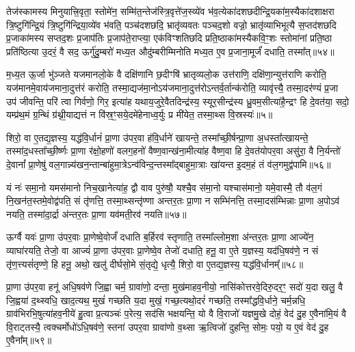 तेज॑स्कामस्य मिनुयात्त्रि॒वृता॒ स्तोमे॑न॒ सम्मि॑त॒न्तेज॑स्त्रि॒वृत्ते॑ज॒स्व्ये॑व भ॑व॒त्येका॑दशछदीन्द्रि॒यका॑म॒स्यैका॑दशाक्षरा त्रि॒ष्टुगि॑न्द्रि॒यं त्रि॒ष्टुगि॑न्द्रिया॒व्ये॑व भ॑वति॒ पञ्च॑दशछदि॒ भ्रातृ॑व्यवतः पञ्चद॒शो वज्रो॒ भ्रातृ॑व्याभिभूत्यै स॒प्तद॑शछदि प्र॒जाका॑मस्य सप्तद॒शः प्र॒जाप॑तिः प्र॒जाप॑ते॒राप्त्या॒ एक॑विꣳशतिछदि प्रति॒ष्ठाका॑मस्यैकवि॒ꣳ॒शः स्तोमा॑नां प्रति॒ष्ठा प्रति॑ष्ठित्या उ॒दरं॒ वै सद॒ ऊर्गु॑दु॒म्बरो॑ मध्य॒त औदु॑म्बरीम्मिनोति मध्य॒त ए॒व प्र॒जाना॒मूर्जं॑ दधाति॒ तस्मा᳚त्॥५४॥

म॒ध्य॒त ऊ॒र्जा भु॑ञ्जते यजमानलो॒के वै दक्षि॑णानि छ॒दीꣳषि॑ भ्रातृव्यलो॒क उत्त॑राणि॒ दक्षि॑णा॒न्युत्त॑राणि करोति॒ यज॑मानमे॒वाय॑जमाना॒दुत्त॑रं करोति॒ तस्मा॒द्यज॑मा॒नो\-ऽय॑जमाना॒दुत्त॑रो\-ऽन्तर्व॒र्तान्क॑रोति॒ व्यावृ॑त्त्यै॒ तस्मा॒दर॑ण्यं प्र॒जा उप॑ जीवन्ति॒ परि॑ त्वा गिर्वणो॒ गिर॒ इत्या॑ह यथाय॒जुरे॒वैतदिन्द्र॑स्य॒ स्यूर॒सीन्द्र॑स्य ध्रु॒वम॒सीत्या॑है॒न्द्रꣳ हि दे॒वत॑या॒ सदो॒ यम्प्र॑थ॒मं ग्र॒न्थिं ग्र॑थ्नी॒याद्यत्तं न वि॑स्र॒ꣳ॒सये॒दमे॑हेनाध्व॒र्युः प्र मी॑येत॒ तस्मा॒थ्स वि॒स्रस्यः॑॥५॥

{\anuvakamend[{अप॑हत्यै॒ तस्मा᳚त्पितृदेव॒त्य॑न्तेनै॒व नव॑छदि॒ तस्मा॒थ्सदः॒ पञ्च॑दश च॥10॥}]}

शिरो॒ वा ए॒तद्य॒ज्ञस्य॒ यद्ध॑वि॒र्धानं॑ प्रा॒णा उ॑पर॒वा ह॑वि॒र्धाने॑ खायन्ते॒ तस्मा᳚च्छी॒र्\mbox{}षन्प्रा॒णा अ॒धस्ता᳚त्खायन्ते॒ तस्मा॑द॒धस्ता᳚च्छी॒र्ष्णः प्रा॒णा र॑क्षो॒हणो॑ वलग॒हनो॑ वैष्ण॒वान्ख॑ना॒मीत्या॑ह वैष्ण॒वा हि दे॒वत॑योपर॒वा असु॑रा॒ वै नि॒र्यन्तो॑ दे॒वानां᳚ प्रा॒णेषु॑ वल॒गान्न्य॑खन॒न्तान्बा॑हुमा॒त्रे\-ऽन्व॑विन्द॒न्तस्मा᳚द्बाहुमा॒त्राः खा॑यन्त इ॒दम॒हं तं व॑ल॒गमुद्व॑पामि॥५६॥

यं नः॑ समा॒नो यमस॑मानो निच॒खानेत्या॑ह॒ द्वौ वाव पुरु॑षौ॒ यश्चै॒व स॑मा॒नो यश्चास॑मानो॒ यमे॒वास्मै॒ तौ व॑ल॒गं नि॒खन॑त॒स्तमे॒वोद्व॑पति॒ सं तृ॑णत्ति॒ तस्मा॒थ्सन्तृ॑ण्णा अन्तर॒तः प्रा॒णा न सम्भि॑नत्ति॒ तस्मा॒दस॑म्भिन्नाः प्रा॒णा अ॒पो\-ऽव॑ नयति॒ तस्मा॑दा॒र्द्रा अ॑न्तर॒तः प्रा॒णा यव॑मती॒रव॑ नयति॥५७॥

ऊर्ग्वै यवः॑ प्रा॒णा उ॑पर॒वाः प्रा॒णेष्वे॒वोर्जं॑ दधाति ब॒र्\mbox{}हिरव॑ स्तृणाति॒ तस्मा᳚ल्लोम॒शा अ॑न्तर॒तः प्रा॒णा आज्ये॑न॒ व्याघा॑रयति॒ तेजो॒ वा आज्यं॑ प्रा॒णा उ॑पर॒वाः प्रा॒णेष्वे॒व तेजो॑ दधाति॒ हनू॒ वा ए॒ते य॒ज्ञस्य॒ यद॑धि॒षव॑णे॒ न सं तृ॑ण॒त्त्यसं॑तृण्णे॒ हि हनू॒ अथो॒ खलु॑ दीर्घसो॒मे सं॒तृद्ये॒ धृत्यै॒ शिरो॒ वा ए॒तद्य॒ज्ञस्य॒ यद्ध॑वि॒र्धानम्᳚॥५८॥

प्रा॒णा उ॑पर॒वा हनू॑ अधि॒षव॑णे जि॒ह्वा चर्म॒ ग्रावा॑णो॒ दन्ता॒ मुख॑माहव॒नीयो॒ नासि॑कोत्तरवे॒दिरु॒दर॒ꣳ॒ सदो॑ य॒दा खलु॒ वै जि॒ह्वया॑ द॒थ्स्वधि॒ खाद॒त्यथ॒ मुखं॑ गच्छति य॒दा मुखं॒ गच्छ॒त्यथो॒दरं॑ गच्छति॒ तस्मा᳚द्धवि॒र्धाने॒ चर्म॒न्नधि॒ ग्राव॑भिरभि॒षुत्या॑हव॒नीये॑ हु॒त्वा प्र॒त्यञ्चः॑ प॒रेत्य॒ सद॑सि भक्षयन्ति॒ यो वै वि॒राजो॑ यज्ञमु॒खे दोहं॒ वेद॑ दु॒ह ए॒वैना॑मि॒यं वै वि॒राट्तस्यै॒ त्वक्चर्मोधो॑\-ऽधि॒षव॑णे॒ स्तना॑ उपर॒वा ग्रावा॑णो व॒थ्सा ऋ॒त्विजो॑ दुहन्ति॒ सोमः॒ पयो॒ य ए॒वं वेद॑ दु॒ह ए॒वैना᳚म्॥५९॥

